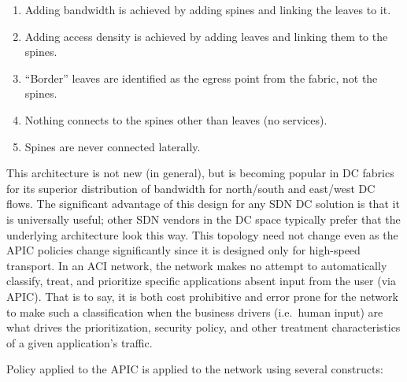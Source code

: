 \begin{enumerate}
  \item Adding bandwidth is achieved by adding spines and linking the leaves to it.
  \item Adding access density is achieved by adding leaves and linking them to
  the spines.
  \item ``Border'' leaves are identified as the egress point from the fabric,
  not the spines.
  \item Nothing connects to the spines other than leaves (no services).
  \item Spines are never connected laterally.
\end{enumerate}

This architecture is not new (in general), but is becoming popular in DC
fabrics for its superior distribution of bandwidth for north/south and
east/west DC flows. The significant advantage of this design for any SDN DC
solution is that it is universally useful; other SDN vendors in the DC space
typically prefer that the underlying architecture look this way. This topology
need not change even as the APIC policies change significantly since it is
designed only for high-speed transport. In an ACI network, the network makes
no attempt to automatically classify, treat, and prioritize specific
applications absent input from the user (via APIC). That is to say, it is both
cost prohibitive and error prone for the network to make such a classification
when the business drivers (i.e.\ human input) are what drives the
prioritization, security policy, and other treatment characteristics of a
given application's traffic.

Policy applied to the APIC is applied to the network using several constructs:

